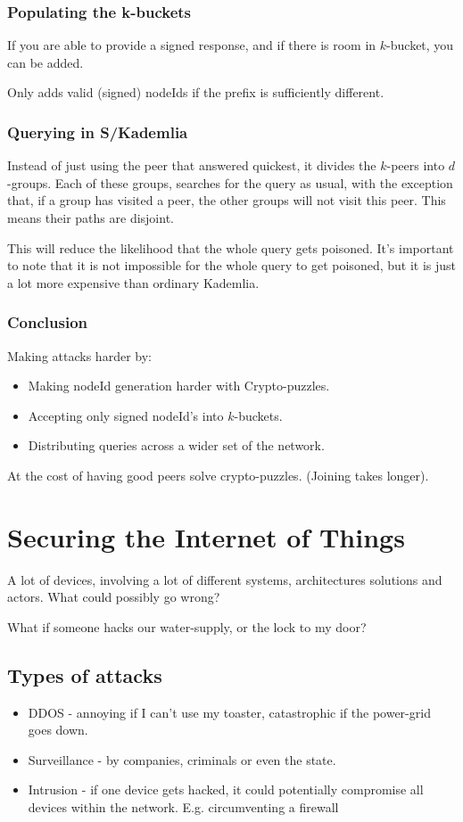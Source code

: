	\subsubsection{Populating the k-buckets}
	If you are able to provide a signed response, and if there is room in $k$-bucket, you can be added.
	
	Only adds valid (signed) nodeIds if the prefix is sufficiently different.
	
	\subsubsection{Querying in S/Kademlia}
	Instead of just using the peer that answered quickest, it divides the $k$-peers into $d$-groups. Each of these groups, searches for the query as usual, with the exception that, if a group has visited a peer, the other groups will not visit this peer. This means their paths are disjoint. 
	
	This will reduce the likelihood that the whole query gets poisoned. It's important to note that it is not impossible for the whole query to get poisoned, but it is just a lot more expensive than ordinary Kademlia.
	
	\subsubsection{Conclusion}
	Making attacks harder by:
	\begin{itemize}
		\item Making nodeId generation harder with Crypto-puzzles.
		\item Accepting only signed nodeId's into $k$-buckets.
		\item Distributing queries across a wider set of the network.
	\end{itemize}
	At the cost of having good peers solve crypto-puzzles. (Joining takes longer).
	
	\section{Securing the Internet of Things}
	A lot of devices, involving a lot of different systems, architectures solutions and actors. What could possibly go wrong?
	
	What if someone hacks our water-supply, or the lock to my door?
	
	\subsection{Types of attacks}
	\begin{itemize}
		\item \gls{DDOS} - annoying if I can't use my toaster, catastrophic if the power-grid goes down.
		\item Surveillance - by companies, criminals or even the state.
		\item Intrusion - if one device gets hacked, it could potentially compromise all devices within the network. E.g. circumventing a firewall
	\end{itemize}
	
